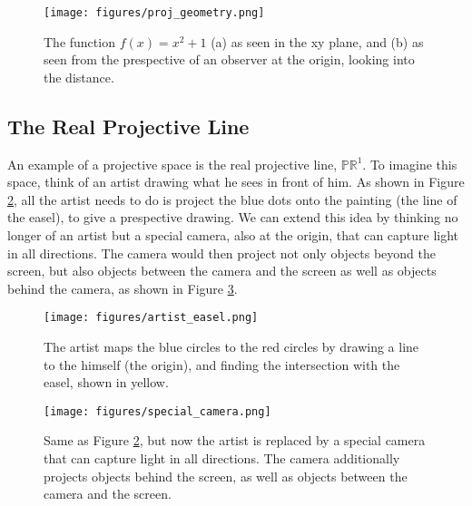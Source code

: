 \begin{figure}[H]
   \centering
   \texttt{[image: figures/proj\_geometry.png]}
   \caption{The function $f(x) = x^2 + 1$ (a) as seen in the xy plane, and (b) as seen from the prespective of an observer at the origin, looking into the distance.}
   \label{fig:proj_geometry}
\end{figure}

\subsection{The Real Projective Line}

An example of a projective space is the real projective line, $\mathbb{PR}^1$. To imagine this space, think of an artist drawing what he sees in front of him. As shown in Figure \ref{fig:artist}, all the artist needs to do is project the blue dots onto the painting (the line of the easel), to give a prespective drawing. We can extend this idea by thinking no longer of an artist but a special camera, also at the origin, that can capture light in all directions. The camera would then project not only objects beyond the screen, but also objects between the camera and the screen as well as objects behind the camera, as shown in Figure \ref{fig:camera}. 


\begin{figure}[H]
   \centering
   \texttt{[image: figures/artist\_easel.png]}
   \caption{The artist maps the blue circles to the red circles by drawing a line to the himself (the origin), and finding the intersection with the easel, shown in yellow.}
   \label{fig:artist}
\end{figure}

\begin{figure}[H]
   \centering
   \texttt{[image: figures/special\_camera.png]}
   \caption{Same as Figure \ref{fig:artist}, but now the artist is replaced by a special camera that can capture light in all directions. The camera additionally projects objects behind the screen, as well as objects between the camera and the screen.}
   \label{fig:camera}
\end{figure}

\newpage

